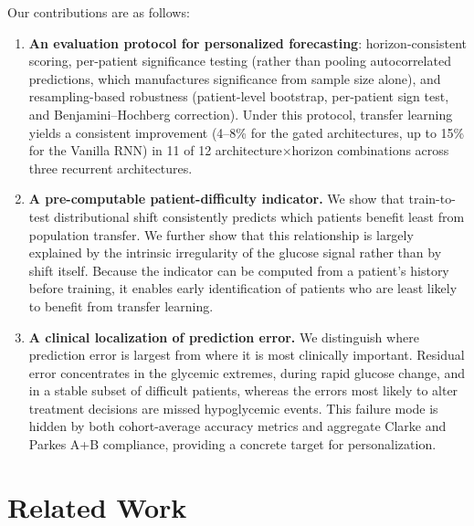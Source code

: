 \documentclass[conference]{IEEEtran}
\begin{document}
Our contributions are as follows:

\begin{enumerate}
  \item \textbf{An evaluation protocol for personalized forecasting}: horizon-consistent
  scoring, per-patient significance testing (rather than pooling autocorrelated
  predictions, which manufactures significance from sample size alone), and
  resampling-based robustness (patient-level bootstrap, per-patient sign test,
  and Benjamini--Hochberg correction). Under this protocol, transfer learning
  yields a consistent improvement (4--8\% for the gated architectures, up to 15\%
  for the Vanilla RNN) in 11 of 12 architecture$\times$horizon combinations across
  three recurrent architectures.

  \item \textbf{A pre-computable patient-difficulty indicator.} We show that
  train-to-test distributional shift consistently predicts which patients benefit
  least from population transfer. We further show that this relationship is
  largely explained by the intrinsic irregularity of the glucose signal rather
  than by shift itself. Because the indicator can be computed from a patient's
  history before training, it enables early identification of patients who are
  least likely to benefit from transfer learning.

  \item \textbf{A clinical localization of prediction error.} We distinguish
  where prediction error is largest from where it is most clinically important.
  Residual error concentrates in the glycemic extremes, during rapid glucose
  change, and in a stable subset of difficult patients, whereas the errors most
  likely to alter treatment decisions are missed hypoglycemic events. This
  failure mode is hidden by both cohort-average accuracy metrics and aggregate
  Clarke and Parkes A+B compliance, providing a concrete target for
  personalization.
\end{enumerate}
\section{Related Work}
\label{sec:related}
\end{document}
